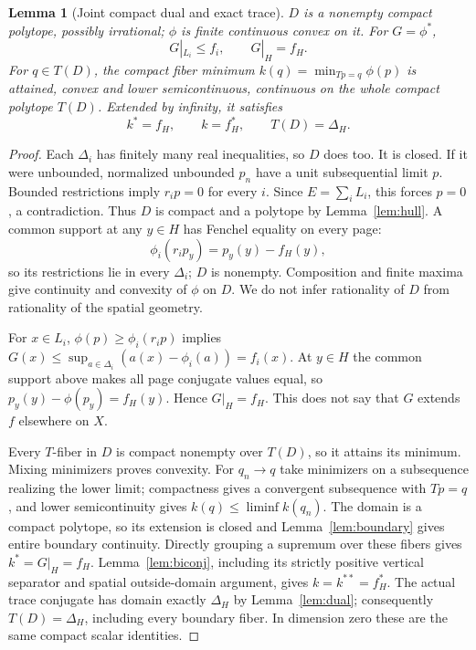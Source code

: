 \documentclass[11pt]{article}
\newtheorem{lemma}[theorem]{Lemma}
\begin{document}
\begin{lemma}[Joint compact dual and exact trace]\label{lem:joint}
$D$ is a nonempty compact polytope, possibly irrational; $\phi$ is finite continuous convex on it. For $G=\phi^*$,
\[
 G|_{L_i}\leq f_i,\qquad G|_H=f_H.
\]
For $q\in T(D)$, the compact fiber minimum $k(q)=\min_{Tp=q}\phi(p)$ is attained, convex and lower semicontinuous, continuous on the whole compact polytope $T(D)$. Extended by infinity, it satisfies
\[
 k^*=f_H,\qquad k=f_H^*,\qquad T(D)=\Delta_H.                           \tag{JF}
\]
\end{lemma}
\begin{proof}
Each $\Delta_i$ has finitely many real inequalities, so $D$ does too. It is closed. If it were unbounded, normalized unbounded $p_n$ have a unit subsequential limit $p$. Bounded restrictions imply $r_ip=0$ for every $i$. Since $E=\sum_iL_i$, this forces $p=0$, a contradiction. Thus $D$ is compact and a polytope by Lemma~\ref{lem:hull}. A common support at any $y\in H$ has Fenchel equality on every page:
\[
 \phi_i(r_ip_y)=p_y(y)-f_H(y),
\]
so its restrictions lie in every $\Delta_i$; $D$ is nonempty. Composition and finite maxima give continuity and convexity of $\phi$ on $D$. We do not infer rationality of $D$ from rationality of the spatial geometry.

For $x\in L_i$, $\phi(p)\geq\phi_i(r_ip)$ implies
$G(x)\leq\sup_{a\in\Delta_i}(a(x)-\phi_i(a))=f_i(x)$. At $y\in H$ the common support above makes all page conjugate values equal, so $p_y(y)-\phi(p_y)=f_H(y)$. Hence $G|_H=f_H$. This does not say that $G$ extends $f$ elsewhere on $X$.

Every $T$-fiber in $D$ is compact nonempty over $T(D)$, so it attains its minimum. Mixing minimizers proves convexity. For $q_n\to q$ take minimizers on a subsequence realizing the lower limit; compactness gives a convergent subsequence with $Tp=q$, and lower semicontinuity gives $k(q)\leq\liminf k(q_n)$. The domain is a compact polytope, so its extension is closed and Lemma~\ref{lem:boundary} gives entire boundary continuity. Directly grouping a supremum over these fibers gives $k^*=G|_H=f_H$. Lemma~\ref{lem:biconj}, including its strictly positive vertical separator and spatial outside-domain argument, gives $k=k^{**}=f_H^*$. The actual trace conjugate has domain exactly $\Delta_H$ by Lemma~\ref{lem:dual}; consequently $T(D)=\Delta_H$, including every boundary fiber. In dimension zero these are the same compact scalar identities.
\end{proof}
\end{document}
